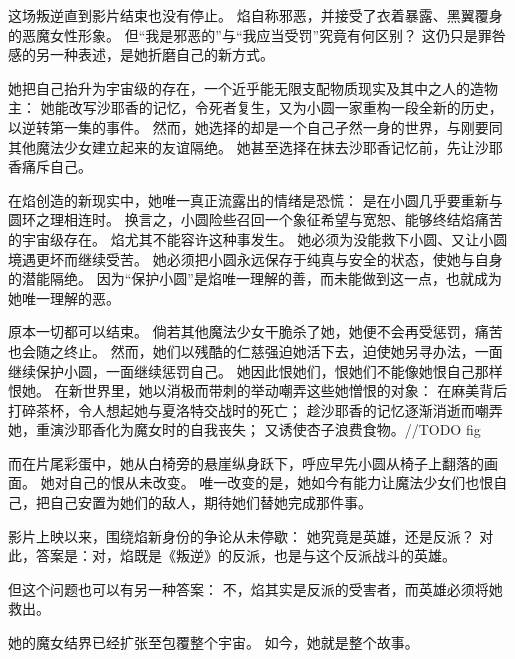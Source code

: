 这场叛逆直到影片结束也没有停止。
焰自称邪恶，并接受了衣着暴露、黑翼覆身的恶魔女性形象。
但“我是邪恶的”与“我应当受罚”究竟有何区别？
这仍只是罪咎感的另一种表述，是她折磨自己的新方式。

她把自己抬升为宇宙级的存在，一个近乎能无限支配物质现实及其中之人的造物主：
她能改写沙耶香的记忆，令死者复生，又为小圆一家重构一段全新的历史，以逆转第一集的事件。
然而，她选择的却是一个自己孑然一身的世界，与刚要同其他魔法少女建立起来的友谊隔绝。
她甚至选择在抹去沙耶香记忆前，先让沙耶香痛斥自己。

在焰创造的新现实中，她唯一真正流露出的情绪是恐慌：
是在小圆几乎要重新与圆环之理相连时。
换言之，小圆险些召回一个象征希望与宽恕、能够终结焰痛苦的宇宙级存在。
焰尤其不能容许这种事发生。
她必须为没能救下小圆、又让小圆境遇更坏而继续受苦。
她必须把小圆永远保存于纯真与安全的状态，使她与自身的潜能隔绝。
因为“保护小圆”是焰唯一理解的善，而未能做到这一点，也就成为她唯一理解的恶。

原本一切都可以结束。
倘若其他魔法少女干脆杀了她，她便不会再受惩罚，痛苦也会随之终止。
然而，她们以残酷的仁慈强迫她活下去，迫使她另寻办法，一面继续保护小圆，一面继续惩罚自己。
她因此恨她们，恨她们不能像她恨自己那样恨她。
在新世界里，她以消极而带刺的举动嘲弄这些她憎恨的对象：
在麻美背后打碎茶杯，令人想起她与夏洛特交战时的死亡；
趁沙耶香的记忆逐渐消逝而嘲弄她，重演沙耶香化为魔女时的自我丧失；
又诱使杏子浪费食物。//TODO fig

而在片尾彩蛋中，她从白椅旁的悬崖纵身跃下，呼应早先小圆从椅子上翻落的画面。
她对自己的恨从未改变。
唯一改变的是，她如今有能力让魔法少女们也恨自己，把自己安置为她们的敌人，期待她们替她完成那件事。

影片上映以来，围绕焰新身份的争论从未停歇：
她究竟是英雄，还是反派？
对此，答案是：对，焰既是《叛逆》的反派，也是与这个反派战斗的英雄。

但这个问题也可以有另一种答案：
不，焰其实是反派的受害者，而英雄必须将她救出。

她的魔女结界已经扩张至包覆整个宇宙。
如今，她就是整个故事。
